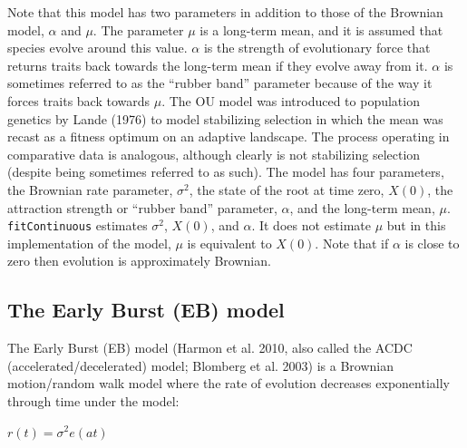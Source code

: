 \documentclass[]{book}
\theoremstyle{definition}
\theoremstyle{definition}
\theoremstyle{definition}
\theoremstyle{remark}
\begin{document}
Note that this model has two parameters in addition to those of the
Brownian model, \(\alpha\) and \(\mu\). The parameter \(\mu\) is a
long-term mean, and it is assumed that species evolve around this value.
\(\alpha\) is the strength of evolutionary force that returns traits
back towards the long-term mean if they evolve away from it. \(\alpha\)
is sometimes referred to as the ``rubber band'' parameter because of the
way it forces traits back towards \(\mu\). The OU model was introduced
to population genetics by Lande (1976) to model stabilizing selection in
which the mean was recast as a fitness optimum on an adaptive landscape.
The process operating in comparative data is analogous, although clearly
is not stabilizing selection (despite being sometimes referred to as
such). The model has four parameters, the Brownian rate parameter,
\(\sigma^2\), the state of the root at time zero, \(X(0)\), the
attraction strength or ``rubber band'' parameter, \(\alpha\), and the
long-term mean, \(\mu\). \texttt{fitContinuous} estimates \(\sigma^2\),
\(X(0)\), and \(\alpha\). It does not estimate \(\mu\) but in this
implementation of the model, \(\mu\) is equivalent to \(X(0)\). Note
that if \(\alpha\) is close to zero then evolution is approximately
Brownian.

\subsection{The Early Burst (EB) model}\label{the-early-burst-eb-model}

The Early Burst (EB) model (Harmon et al. 2010, also called the ACDC
(accelerated/decelerated) model; Blomberg et al. 2003) is a Brownian
motion/random walk model where the rate of evolution decreases
exponentially through time under the model:

\(r(t) = \sigma^2e(at)\)
\end{document}
